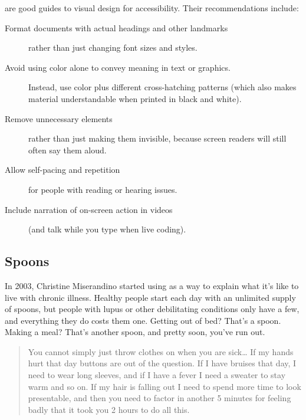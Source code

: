 \cite{Coom2012,Burg2015} are good guides to visual design for accessibility.
Their recommendations include:

\begin{description}

\item[Format documents with actual headings and other landmarks]
  rather than just changing font sizes and styles.

\item[Avoid using color alone to convey meaning in text or graphics.]
  Instead, use color plus different cross-hatching patterns
  (which also makes material understandable when printed in black and white).

\item[Remove unnecessary elements]
  rather than just making them invisible,
  because screen readers will still often say them aloud.

\item[Allow self-pacing and repetition]
  for people with reading or hearing issues.

\item[Include narration of on-screen action in videos]
  (and talk while you type when live coding).

\end{description}

\subsection*{Spoons}

In 2003,
Christine Miserandino started using 
as a way to explain what it's like to live with chronic illness.
Healthy people start each day with an unlimited supply of spoons,
but people with lupus or other debilitating conditions only have a few,
and everything they do costs them one.
Getting out of bed?
That's a spoon.
Making a meal?
That's another spoon, and pretty soon, you've run out.

\begin{quote}

  You cannot simply just throw clothes on when you are sick{\ldots}
  If my hands hurt that day buttons are out of the question.
  If I have bruises that day,
  I need to wear long sleeves,
  and if I have a fever I need a sweater to stay warm and so on.
  If my hair is falling out I need to spend more time to look presentable,
  and then you need to factor in another 5 minutes for feeling badly
  that it took you 2 hours to do all this.

\end{quote}

